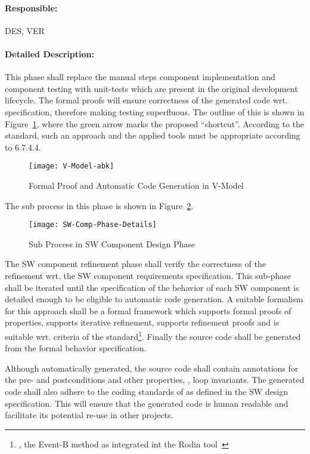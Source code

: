 \paragraph{Responsible:}
\label{sec:sw-comp-responsible}
DES, VER

\paragraph{Detailed Description:}
\label{sec:sw-comp-deta-descr}
This phase shall replace the manual steps component implementation and component
testing with unit-tests which are present in the original development
lifecycle. The formal proofs will ensure correctness of the generated code
wrt. specification, therefore making testing superfluous. The outline of this is
shown in Figure~\ref{fig:proof-code-generation}, where the green arrow marks the
proposed ``shortcut''. According to the standard, such an approach and the
applied tools must be appropriate according to 6.7.4.4.

\begin{figure}[ht]
  \centering
  \texttt{[image: V-Model-abk]}
  \caption{Formal Proof and Automatic Code Generation in V-Model}
  \label{fig:proof-code-generation}
\end{figure}

The sub process in this phase is shown in
Figure~\ref{fig:detailed-sw-comp-phase}.

\begin{figure}[ht]
  \centering
  \texttt{[image: SW-Comp-Phase-Details]}
  \caption{Sub Process in SW Component Design Phase}
  \label{fig:detailed-sw-comp-phase}
\end{figure}

The SW component refinement phase shall verify the correctness of the refinement
wrt. the SW component requirements specification. This sub-phase shall be
iterated until the specification of the behavior of each SW component is
detailed enough to be eligible to automatic code generation. A suitable
formalism for this approach shall be a formal framework which supports formal
proofs of properties, supports iterative refinement, supports refinement proofs
and is suitable wrt. criteria of the standard\footnote{\eg, the Event-B method
  as integrated int the Rodin tool~\cite{Abrial:Rodin}}. Finally the source code
shall be generated from the formal behavior specification.

Although automatically generated, the source code shall contain annotations for
the pre- and postconditions and other properties, \eg, loop invariants. The
generated code shall also adhere to the coding standards of as defined in the SW
design specification. This will ensure that the generated code is human readable
and facilitate its potential re-use in other projects.


